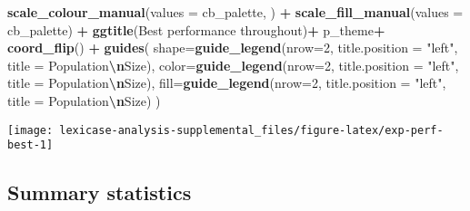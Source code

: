\documentclass[
]{book}
\newenvironment{Shaded}{\begin{snugshade}}{\end{snugshade}}
\newcommand{\AttributeTok}[1]{\textcolor[rgb]{0.13,0.29,0.53}{#1}}
\newcommand{\DecValTok}[1]{\textcolor[rgb]{0.00,0.00,0.81}{#1}}
\newcommand{\FunctionTok}[1]{\textcolor[rgb]{0.13,0.29,0.53}{\textbf{#1}}}
\newcommand{\NormalTok}[1]{#1}
\newcommand{\SpecialCharTok}[1]{\textcolor[rgb]{0.81,0.36,0.00}{\textbf{#1}}}
\newcommand{\StringTok}[1]{\textcolor[rgb]{0.31,0.60,0.02}{#1}}
\begin{document}
\begin{Shaded}
\begin{Highlighting}[]
  \FunctionTok{scale\_colour\_manual}\NormalTok{(}\AttributeTok{values =}\NormalTok{ cb\_palette, ) }\SpecialCharTok{+}
  \FunctionTok{scale\_fill\_manual}\NormalTok{(}\AttributeTok{values =}\NormalTok{ cb\_palette) }\SpecialCharTok{+}
  \FunctionTok{ggtitle}\NormalTok{(}\StringTok{\textquotesingle{}Best performance throughout\textquotesingle{}}\NormalTok{)}\SpecialCharTok{+}
\NormalTok{  p\_theme}\SpecialCharTok{+} \FunctionTok{coord\_flip}\NormalTok{() }\SpecialCharTok{+}
  \FunctionTok{guides}\NormalTok{(}
    \AttributeTok{shape=}\FunctionTok{guide\_legend}\NormalTok{(}\AttributeTok{nrow=}\DecValTok{2}\NormalTok{, }\AttributeTok{title.position =} \StringTok{"left"}\NormalTok{, }\AttributeTok{title =} \StringTok{\textquotesingle{}Population}\SpecialCharTok{\textbackslash{}n}\StringTok{Size\textquotesingle{}}\NormalTok{),}
    \AttributeTok{color=}\FunctionTok{guide\_legend}\NormalTok{(}\AttributeTok{nrow=}\DecValTok{2}\NormalTok{, }\AttributeTok{title.position =} \StringTok{"left"}\NormalTok{, }\AttributeTok{title =} \StringTok{\textquotesingle{}Population}\SpecialCharTok{\textbackslash{}n}\StringTok{Size\textquotesingle{}}\NormalTok{),}
    \AttributeTok{fill=}\FunctionTok{guide\_legend}\NormalTok{(}\AttributeTok{nrow=}\DecValTok{2}\NormalTok{, }\AttributeTok{title.position =} \StringTok{"left"}\NormalTok{, }\AttributeTok{title =} \StringTok{\textquotesingle{}Population}\SpecialCharTok{\textbackslash{}n}\StringTok{Size\textquotesingle{}}\NormalTok{)}
\NormalTok{  )}
\end{Highlighting}
\end{Shaded}

\texttt{[image: lexicase-analysis-supplemental\_files/figure-latex/exp-perf-best-1]}

\hypertarget{summary-statistics}{%
\subsection{Summary statistics}\label{summary-statistics}}
\end{document}

